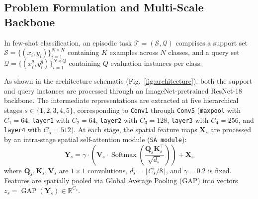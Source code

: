 \documentclass[conference]{IEEEtran}
\begin{document}
\subsection{Problem Formulation and Multi-Scale Backbone}
In few-shot classification, an episodic task $\mathcal{T} = (\mathcal{S}, \mathcal{Q})$ comprises a support set $\mathcal{S} = \{(x_i, y_i)\}_{i=1}^{N \times K}$ containing $K$ examples across $N$ classes, and a query set $\mathcal{Q} = \{(x_i^q, y_i^q)\}_{i=1}^{N \times Q}$ containing $Q$ evaluation instances per class.

As shown in the architecture schematic (Fig.~\ref{fig:architecture}), both the support and query instances are processed through an ImageNet-pretrained ResNet-18 backbone. The intermediate representations are extracted at five hierarchical stages $s \in \{1, 2, 3, 4, 5\}$, corresponding to \texttt{Conv1} through \texttt{Conv5} (\texttt{maxpool} with $C_1=64$, \texttt{layer1} with $C_2=64$, \texttt{layer2} with $C_3=128$, \texttt{layer3} with $C_4=256$, and \texttt{layer4} with $C_5=512$). At each stage, the spatial feature maps $\mathbf{X}_s$ are processed by an intra-stage spatial self-attention module (\texttt{SA module}):
\begin{equation}
    \mathbf{Y}_s = \gamma \cdot \left( \mathbf{V}_s \cdot \operatorname{Softmax}\left(\frac{\mathbf{Q}_s \mathbf{K}_s^\top}{\sqrt{d_s}}\right) \right) + \mathbf{X}_s
\end{equation}
where $\mathbf{Q}_s, \mathbf{K}_s, \mathbf{V}_s$ are $1 \times 1$ convolutions, $d_s = \lfloor C_s / 8 \rfloor$, and $\gamma = 0.2$ is fixed. Features are spatially pooled via Global Average Pooling (GAP) into vectors $z_s = \operatorname{GAP}(\mathbf{Y}_s) \in \mathbb{R}^{C_s}$.
\end{document}
